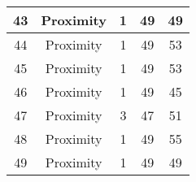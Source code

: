 \documentclass[results.tex]{subfiles}
\begin{document}
\begin{center}
\begin{tabular}{| c || c | c | c | c |}
            \hline
            43                      & Proximity                    & 1                      & 49                      & 49                   \\
            \hline
            44                      & Proximity                    & 1                      & 49                      & 53                   \\
            \hline
            45                      & Proximity                    & 1                      & 49                      & 53                   \\
            \hline
            46                      & Proximity                    & 1                      & 49                      & 45                   \\
            \hline
            47                      & Proximity                    & 3                      & 47                      & 51                   \\
            \hline
            48                      & Proximity                    & 1                      & 49                      & 55                   \\
            \hline
            49                      & Proximity                    & 1                      & 49                      & 49                   \\
            \hline
        \end{tabular}
    \end{center}
\end{document}
